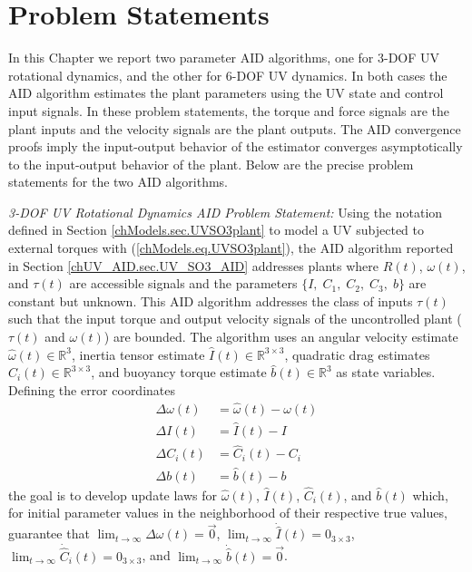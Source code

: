 \section{Problem Statements}
\label{chUV_AID.sec.probStatement}

In this Chapter we report two parameter \ac{AID} algorithms, one for
3-\ac{DOF} \ac{UV} rotational dynamics, and the other for 6-\ac{DOF}
\ac{UV} dynamics.  In both cases the \ac{AID} algorithm estimates the
plant parameters using the \ac{UV} state and control input signals.
In these problem statements, the torque and force signals are the
plant inputs and the velocity signals are the plant outputs.  The
\ac{AID} convergence proofs imply the input-output behavior of the
estimator converges asymptotically to the input-output behavior of the
plant. Below are the precise problem statements for the two \ac{AID}
algorithms.


\vspace*{5mm} { \it  3-\ac{DOF} \ac{UV}
 Rotational Dynamics \ac{AID} Problem Statement:} 
%
Using the notation defined in Section
\ref{chModels.sec.UVSO3plant} to model a \ac{UV} subjected to external
torques with (\ref{chModels.eq.UVSO3plant}), the \ac{AID} algorithm
reported in Section \ref{chUV_AID.sec.UV_SO3_AID} addresses plants
where $R(t)$, $\omega(t)$, and $\tau(t)$ are accessible signals and
the parameters $\{I,\; C_1,\; C_2,\; C_3,\; b\}$ are constant but
unknown.  This \ac{AID} algorithm addresses the class of inputs
$\tau(t)$ such that the input torque and output velocity signals of
the uncontrolled plant ($\tau(t)$ and $\omega(t)$) are bounded. The
algorithm uses an angular velocity estimate $\hat{\omega}(t)\in
\mathbb{R}^{3}$, inertia tensor estimate
$\hat{I}(t)\in\mathbb{R}^{3\times 3}$, quadratic drag estimates
$\hat{C}_i(t)\in\mathbb{R}^{3\times 3}$, and buoyancy torque
estimate $\hat{b}(t)\in \mathbb{R}^{3}$ as state variables. Defining
the error coordinates
\begin{align}
\Delta\omega(t)&=\hat{\omega}(t)-\omega(t)  \label{chUV_AID.eq.deltaw} \\
\Delta I(t)&=\hat{I}(t) - I                 \label{chUV_AID.eq.deltaI} \\
\Delta C_i(t)&=\hat{C}_i(t) - C_i             \label{chUV_AID.eq.deltaC} \\
\Delta b(t)&=\hat{b}(t) - b                \label{chUV_AID.eq.deltabSO3} 
\end{align}
\noindent the goal is to develop update laws for $\hat{\omega}(t)$,
$\hat{I}(t)$, $\hat{C}_i(t)$, and $\hat{b}(t)$ which, for initial
parameter values in the neighborhood of their respective true values,
guarantee that $\lim_{t\to \infty}\Delta \omega(t)=\vec{0}$,
$\lim_{t\to \infty}\dot{\hat{I}}(t)=0_{3\times 3}$, $\lim_{t\to
  \infty}\dot{\hat{C}}_i(t)=0_{3\times 3}$, and $\lim_{t\to
  \infty}\dot{\hat{b}}(t)=\vec{0}$. 

